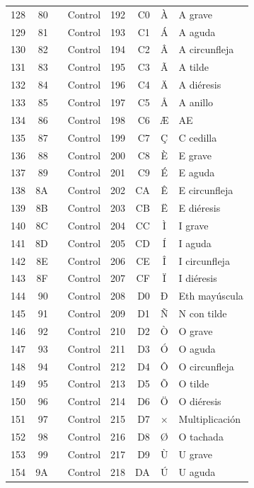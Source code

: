 \documentclass[12pt,twoside]{book}
\begin{document}
\begin{longtable}{r r c l r r c l}
						128 & 80 &  & Control & 192 & C0 & À & A grave \\
						129 & 81 &  & Control & 193 & C1 & Á & A aguda \\
						130 & 82 &  & Control & 194 & C2 & Â & A circunfleja \\
						131 & 83 &  & Control & 195 & C3 & Ã & A tilde \\
						132 & 84 &  & Control & 196 & C4 & Ä & A diéresis \\
						133 & 85 &  & Control & 197 & C5 & Å & A anillo \\
						134 & 86 &  & Control & 198 & C6 & Æ & AE \\
						135 & 87 &  & Control & 199 & C7 & Ç & C cedilla \\
						136 & 88 &  & Control & 200 & C8 & È & E grave \\
						137 & 89 &  & Control & 201 & C9 & É & E aguda \\
						138 & 8A &  & Control & 202 & CA & Ê & E circunfleja \\
						139 & 8B &  & Control & 203 & CB & Ë & E diéresis \\
						140 & 8C &  & Control & 204 & CC & Ì & I grave \\
						141 & 8D &  & Control & 205 & CD & Í & I aguda \\
						142 & 8E &  & Control & 206 & CE & Î & I circunfleja \\
						143 & 8F &  & Control & 207 & CF & Ï & I diéresis \\
						144 & 90 &  & Control & 208 & D0 & Ð & Eth mayúscula \\
						145 & 91 &  & Control & 209 & D1 & Ñ & N con tilde \\
						146 & 92 &  & Control & 210 & D2 & Ò & O grave \\
						147 & 93 &  & Control & 211 & D3 & Ó & O aguda \\
						148 & 94 &  & Control & 212 & D4 & Ô & O circunfleja \\
						149 & 95 &  & Control & 213 & D5 & Õ & O tilde \\
						150 & 96 &  & Control & 214 & D6 & Ö & O diéresis \\
						151 & 97 &  & Control & 215 & D7 & × & Multiplicación \\
						152 & 98 &  & Control & 216 & D8 & Ø & O tachada \\
						153 & 99 &  & Control & 217 & D9 & Ù & U grave \\
						154 & 9A &  & Control & 218 & DA & Ú & U aguda \\

\end{longtable}
\end{document}
